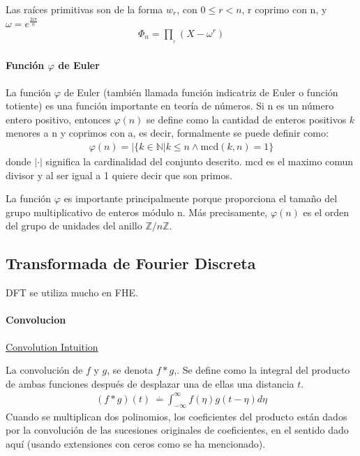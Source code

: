 \documentclass[12pt, oneside]{article}
\begin{document}
 Las raíces primitivas son de la forma $w_r$, con $0 \leq r < n$, r coprimo con n, y $\omega =e^{\frac {2i\pi }{n}}$
\begin{align*}
 \Phi _{n}=\prod _{{}_{r}}(X-\omega ^{r})
\end{align*}
 \paragraph{Función $\varphi$ de Euler}
 La función $\varphi$ de Euler (también llamada función indicatriz de Euler o función totiente)
 es una función importante en teoría de números.
 Si n es un número entero positivo,  entonces $\varphi(n)$ se define como la
 cantidad de enteros positivos $k$ menores a n y
 coprimos con a, es decir, formalmente se puede definir como:
 \begin{align*}
 \varphi(n)=|\{k\in \mathbb {N} |k\leq n\land \mathrm {mcd} (k,n)=1\}
 \end{align*}
 donde $|·|$ significa la cardinalidad del conjunto descrito.
 mcd es el maximo comun divisor y al ser igual a 1 quiere decir que son primos.

La función $\varphi$ es importante principalmente porque proporciona el tamaño del
grupo multiplicativo de enteros módulo n.
Más precisamente, $\varphi (n)$ es el orden del grupo de unidades del anillo
$\mathbb {Z} /n\mathbb {Z}$.

\subsection{Transformada de Fourier Discreta}
DFT se utiliza mucho en FHE.

\paragraph{Convolucion} %
\href{https://betterexplained.com/articles/intuitive-convolution/}{Convolution Intuition}

La convolución de $f$ y $g$, se denota $f*g$,.
Se define como la integral del producto de ambas
funciones después de desplazar una de ellas una distancia $t$.
\begin{align*}
(f*g)(t)\ {\stackrel {\mathrm {.} }{=}}\int _{-\infty }^{\infty }f(\eta )g(t-\eta )d\eta
\end{align*}
Cuando se multiplican dos polinomios, los coeficientes del producto están dados
por la convolución de las sucesiones originales de coeficientes, en el sentido dado
aquí (usando extensiones con ceros como se ha mencionado).
\end{document}

